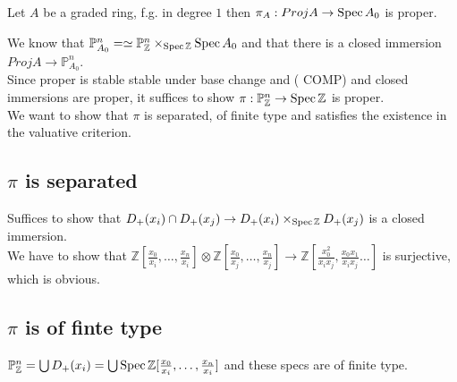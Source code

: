 \documentclass[../main.tex]{subfiles}
\begin{document}
\begin{thm}
	Let $A$ be a graded ring, f.g. in degree $1$ then $\pi_A: Proj A \to \operatorname{Spec} A_0$ is proper.
\end{thm}
\begin{propo}
We know that $\mathbb{P}^{n}_{A_0} = \simeq \mathbb{P}^{n}_{\mathbb{Z}} \times_{\operatorname{Spec} \mathbb{Z}} \operatorname{Spec} A_0$ and that there is a closed immersion $ Proj A \to \mathbb{P}^{n}_{A_0} $.\\
Since proper is stable stable under base change and ( COMP) and closed immersions are proper, it suffices to show $\pi: \mathbb{P}^{n}_{\mathbb{Z}} \to \operatorname{Spec} \mathbb{Z}$ is proper.\\
We want to show that $\pi$ is separated, of finite type and satisfies the existence in the valuative criterion.\\
\subsection*{$\pi$ is separated}
Suffices to show that $D_+( x_i) \cap D_+( x_j) \to D_+( x_i) \times_{\operatorname{Spec} \mathbb{Z}} D_+( x_j) $ is a closed immersion.\\
We have to show that $ \mathbb{Z}[ \frac{x_0}{x_i},\ldots, \frac{x_n}{x_i}]\otimes \mathbb{Z}[ \frac{x_0}{x_j},\ldots, \frac{x_n}{x_j}]\to \mathbb{Z}[ \frac{x_0^{2}}{x_ix_j}, \frac{x_0x_1}{x_ix_j}\ldots ]$ is surjective, which is obvious.
\subsection*{$\pi$ is of finte type}
$ \mathbb{P}^{n}_{ \mathbb{Z}} = \bigcup D_+( x_i) = \bigcup \operatorname{Spec} \mathbb{Z}[ \frac{x_0}{x_i},\ldots, \frac{x_n}{x_i}]$ and these specs are of finite type.
\end{propo}
	
\end{document}
